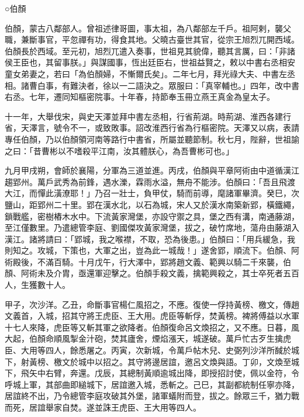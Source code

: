 
\begin{pinyinscope}

 ○伯顏



 伯顏，蒙古八鄰部人。曾祖述律哥圖，事太祖，為八鄰部左千戶。祖阿剌，襲父職，兼斷事官，平忽禪有功，得食其地。父曉古臺世其官，從宗王旭烈兀開西域。伯顏長於西域。至元初，旭烈兀遣入奏事，世祖見其貌偉，聽其言厲，曰：「非諸侯王臣也，其留事朕。」與謀國事，恆出廷臣右，世祖益賢之，敕以中書右丞相安童女弟妻之，若曰「為伯顏婦，不慚爾氏矣」。二年七月，拜光祿大夫、中書左丞相。諸曹白事，有難決者，徐以一二語決之。眾服曰：「真宰輔也。」四年，改中書右丞。七年，遷同知樞密院事。十年春，持節奉玉冊立燕王真金為皇太子。



 十一年，大舉伐宋，與史天澤並拜中書左丞相，行省荊湖。時荊湖、淮西各建行省，天澤言，號令不一，或致敗事。詔改淮西行省為行樞密院。天澤又以病，表請專任伯顏，乃以伯顏領河南等路行中書省，所屬並聽節制。秋七月，陛辭，世祖諭之曰：「昔曹彬以不嗜殺平江南，汝其體朕心，為吾曹彬可也。」



 九月甲戌朔，會師於襄陽，分軍為三道並進。丙戌，伯顏與平章阿術由中道循漢江趨郢州。萬戶武秀為前鋒，遇水濼，霖雨水溢，無舟不能涉。伯顏曰：「吾且飛渡大江，而憚此潢潦耶！」乃召一壯士，負甲仗，騎而前導，麾諸軍畢濟。癸巳，次鹽山，距郢州二十里。郢在漢水北，以石為城，宋人又於漢水南築新郢，橫鐵繩，鎖戰艦，密樹樁木水中。下流黃家灣堡，亦設守禦之具，堡之西有溝，南通藤湖，至江僅數里。乃遣總管李庭、劉國傑攻黃家灣堡，拔之，破竹席地，蕩舟由藤湖入漢江。諸將請曰：「郢城，我之喉襟，不取，恐為後患。」伯顏曰：「用兵緩急，我則知之。攻城，下策也，大軍之出，豈為此一城哉！」遂舍郢，順流下。伯顏、阿術殿後，不滿百騎。十月戊午，行大澤中，郢將趙文義、範興以騎二千來襲，伯顏、阿術未及介胄，亟還軍迎擊之。伯顏手殺文義，擒範興殺之，其士卒死者五百人，生獲數十人。



 甲子，次沙洋。乙丑，命斷事官楊仁風招之，不應。復使一俘持黃榜、檄文，傳趙文義首，入城，招其守將王虎臣、王大用。虎臣等斬俘，焚黃榜。裨將傅益以水軍十七人來降，虎臣等又斬其軍之欲降者。伯顏復命呂文煥招之，又不應。日暮，風大起，伯顏命順風掣金汁砲，焚其廬舍，煙焰漲天，城遂破。萬戶忙古歹生擒虎臣、大用等四人，餘悉屠之。丙寅，次新城，令萬戶帖木兒、史弼列沙洋所馘於城下，射黃榜、檄文於城中以招之。其守將邊居誼，邀呂文煥與語。丁卯，文煥至城下，飛矢中右臂，奔還。戊辰，其總制黃順逾城出降，即授招討使，佩以金符，令呼城上軍，其部曲即縋城下，居誼邀入城，悉斬之。己巳，其副都統制任寧亦降，居誼終不出，乃令總管李庭攻破其外堡，諸軍蟻附而登，拔之。餘眾三千，猶力戰而死，居誼舉家自焚。遂並誅王虎臣、王大用等四人。




\end{pinyinscope}
